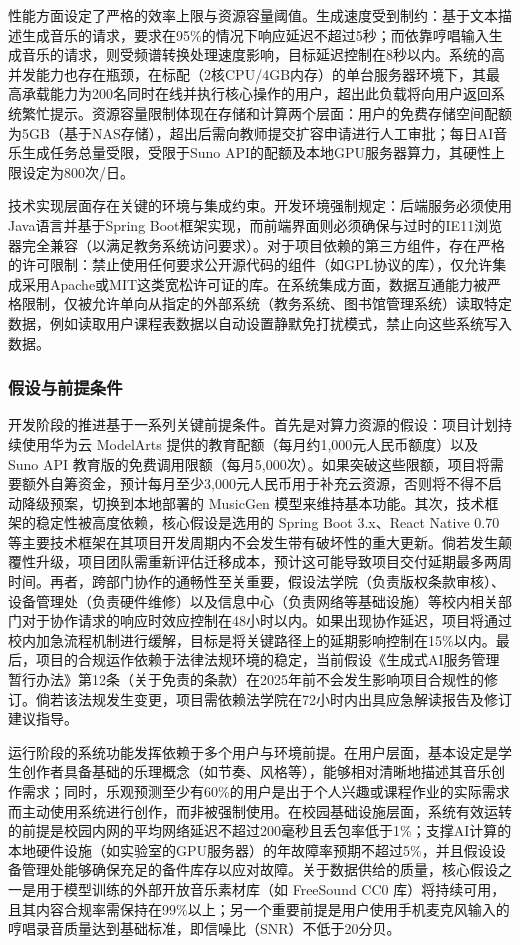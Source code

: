 \documentclass{base}
\numberwithin{figure}{section} %
\begin{document}
性能方面设定了严格的效率上限与资源容量阈值。生成速度受到制约：基于文本描述生成音乐的请求，要求在95\%的情况下响应延迟不超过5秒；而依靠哼唱输入生成音乐的请求，则受频谱转换处理速度影响，目标延迟控制在8秒以内。系统的高并发能力也存在瓶颈，在标配（2核CPU/4GB内存）的单台服务器环境下，其最高承载能力为200名同时在线并执行核心操作的用户，超出此负载将向用户返回系统繁忙提示。资源容量限制体现在存储和计算两个层面：用户的免费存储空间配额为5GB（基于NAS存储），超出后需向教师提交扩容申请进行人工审批；每日AI音乐生成任务总量受限，受限于Suno API的配额及本地GPU服务器算力，其硬性上限设定为800次/日。

技术实现层面存在关键的环境与集成约束。开发环境强制规定：后端服务必须使用Java语言并基于Spring Boot框架实现，而前端界面则必须确保与过时的IE11浏览器完全兼容（以满足教务系统访问要求）。对于项目依赖的第三方组件，存在严格的许可限制：禁止使用任何要求公开源代码的组件（如GPL协议的库），仅允许集成采用Apache或MIT这类宽松许可证的库。在系统集成方面，数据互通能力被严格限制，仅被允许单向从指定的外部系统（教务系统、图书馆管理系统）读取特定数据，例如读取用户课程表数据以自动设置静默免打扰模式，禁止向这些系统写入数据。

\subsubsection{假设与前提条件}

开发阶段的推进基于一系列关键前提条件。​​ 首先是对算力资源的假设：项目计划持续使用华为云 ModelArts 提供的教育配额（每月约1,000元人民币额度）以及 Suno API 教育版的免费调用限额（每月5,000次）。如果突破这些限额，项目将需要额外自筹资金，预计每月至少3,000元人民币用于补充云资源，否则将不得不启动降级预案，切换到本地部署的 MusicGen 模型来维持基本功能。其次，技术框架的稳定性被高度依赖，核心假设是选用的 Spring Boot 3.x、React Native 0.70 等主要技术框架在其项目开发周期内不会发生带有破坏性的重大更新。倘若发生颠覆性升级，项目团队需重新评估迁移成本，预计这可能导致项目交付延期最多两周时间。再者，跨部门协作的通畅性至关重要，假设法学院（负责版权条款审核）、设备管理处（负责硬件维修）以及信息中心（负责网络等基础设施）等校内相关部门对于协作请求的响应时效应控制在48小时以内。如果出现协作延迟，项目将通过校内加急流程机制进行缓解，目标是将关键路径上的延期影响控制在15\%以内。最后，项目的合规运作依赖于法律法规环境的稳定，当前假设《生成式AI服务管理暂行办法》第12条（关于免责的条款）在2025年前不会发生影响项目合规性的修订。倘若该法规发生变更，项目需依赖法学院在72小时内出具应急解读报告及修订建议指导。

​​运行阶段的系统功能发挥依赖于多个用户与环境前提。​​ 在用户层面，基本设定是学生创作者具备基础的乐理概念（如节奏、风格等），能够相对清晰地描述其音乐创作需求；同时，乐观预测至少有60\%的用户是出于个人兴趣或课程作业的实际需求而主动使用系统进行创作，而非被强制使用。在校园基础设施层面，系统有效运转的前提是校园内网的平均网络延迟不超过200毫秒且丢包率低于1\%；支撑AI计算的本地硬件设施（如实验室的GPU服务器）的年故障率预期不超过5\%，并且假设设备管理处能够确保充足的备件库存以应对故障。关于数据供给的质量，核心假设之一是用于模型训练的外部开放音乐素材库（如 FreeSound CC0 库）将持续可用，且其内容合规率需保持在99\%以上；另一个重要前提是用户使用手机麦克风输入的哼唱录音质量达到基础标准，即信噪比（SNR）不低于20分贝。
\end{document}
